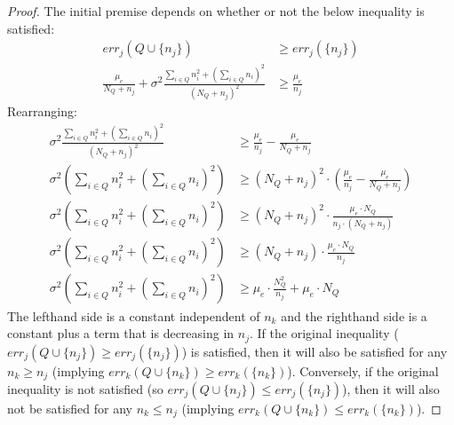 \documentclass{article}
\newcommand{\p}[1]{\left( #1 \right)}
\newcommand{\cd}[0]{\cdot}
\newcommand{\mue}[0]{\ensuremath{\mu_e}}
\newcommand{\var}[0]{\ensuremath{\sigma^2}}
\newcommand{\ndraw}[0]{\ensuremath{n}}
\newcommand{\total}[0]{\ensuremath{N}}
\begin{document}
\begin{proof}
The initial premise depends on whether or not the below inequality is satisfied: 
\begin{align*}
err_j(Q\cup \{\ndraw_j\}) &\geq err_j(\{\ndraw_j\})\\
\frac{\mue}{\total_Q + \ndraw_j} + \var \frac{\sum_{i \in Q} \ndraw_i^2 + \p{\sum_{i \in Q}\ndraw_i}^2}{\p{\total_Q + \ndraw_j}^2}&\geq \frac{\mue}{\ndraw_j}
\end{align*}
Rearranging:
\begin{align*}
\var \frac{\sum_{i \in Q} \ndraw_i^2 + \p{\sum_{i \in Q}\ndraw_i}^2}{\p{\total_Q + \ndraw_j}^2}&\geq \frac{\mue}{\ndraw_j}-\frac{\mue}{\total_Q + \ndraw_j}   \\
 \var \p{\sum_{i \in Q} \ndraw_i^2 + \p{\sum_{i \in Q}\ndraw_i}^2}&\geq \p{\total_Q + \ndraw_j}^2\cd \p{\frac{\mue}{\ndraw_j}-\frac{\mue}{\total_Q + \ndraw_j}}\\
 \var \p{\sum_{i \in Q} \ndraw_i^2 + \p{\sum_{i \in Q}\ndraw_i}^2}&\geq \p{\total_Q + \ndraw_j}^2\cd\frac{\mue \cd \total_Q}{\ndraw_j\cd (\total_Q + \ndraw_j)}\\
 \var \p{\sum_{i \in Q} \ndraw_i^2 + \p{\sum_{i \in Q}\ndraw_i}^2}&\geq \p{\total_Q + \ndraw_j}\cd \frac{\mue \cd \total_Q}{\ndraw_j}\\
 \var \p{\sum_{i \in Q} \ndraw_i^2 + \p{\sum_{i \in Q}\ndraw_i}^2}&\geq \mue \cd \frac{\total_Q^2}{\ndraw_j} + \mue \cd \total_Q
\end{align*}
The lefthand side is a constant independent of $\ndraw_k$ and the righthand side is a constant plus a term that is decreasing in $\ndraw_j$. 
If the original inequality ($err_j(Q\cup \{\ndraw_j\}) \geq err_j(\{\ndraw_j\})$) is satisfied, then it will also be satisfied for any $\ndraw_k \geq \ndraw_j$ (implying $err_k(Q\cup \{\ndraw_k\}) \geq err_k(\{\ndraw_k\})$). Conversely, if the original inequality is not satisfied (so $err_j(Q\cup \{\ndraw_j\}) \leq err_j(\{\ndraw_j\})$), then it will also not be satisfied for any $\ndraw_k \leq \ndraw_j$ (implying $err_k(Q\cup \{\ndraw_k\}) \leq err_k(\{\ndraw_k\})$). 
\end{proof}

\wontleave*
\end{document}
